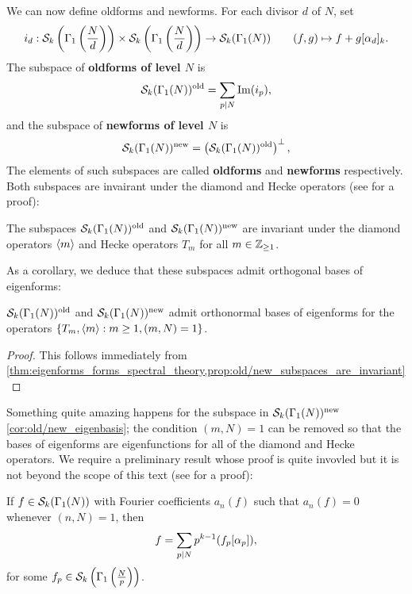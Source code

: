       We can now define oldforms and newforms. For each divisor $d$ of $N$, set
      \[
        i_{d}:\mathcal{S}_{k}\left(\Gamma_{1}\left(\frac{N}{d}\right)\right)\times\mathcal{S}_{k}\left(\Gamma_{1}\left(\frac{N}{d}\right)\right) \to \mathcal{S}_{k}(\Gamma_{1}(N)) \qquad (f,g) \mapsto f+g[\alpha_{d}]_{k}.
      \]
      The subspace of \textbf{oldforms of level $N$} is
      \[
        \mathcal{S}_{k}(\Gamma_{1}(N))^{\mathrm{old}} = \sum_{p \mid N}\mathrm{Im}(i_{p}),
      \]
      and the subspace of \textbf{newforms of level $N$} is
      \[
        \mathcal{S}_{k}(\Gamma_{1}(N))^{\mathrm{new}} = \left(\mathcal{S}_{k}(\Gamma_{1}(N))^{\mathrm{old}} \right)^{\perp},
      \]
      The elements of such subspaces are called \textbf{oldforms} and \textbf{newforms} respectively. Both subspaces are invairant under the diamond and Hecke operators (see \cite{diamond2005first} for a proof):

      \begin{proposition}\label{prop:old/new_subspaces_are_invariant}
        The subspaces $\mathcal{S}_{k}(\Gamma_{1}(N))^{\mathrm{old}}$ and $\mathcal{S}_{k}(\Gamma_{1}(N))^{\mathrm{new}}$ are invariant under the diamond operators $\langle m\rangle$ and Hecke operators $T_{m}$ for all $m \in \mathbb{Z}_{\ge 1}$.
      \end{proposition}

      As a corollary, we deduce that these subspaces admit orthogonal bases of eigenforms:

      \begin{corollary}\label{cor:old/new_eigenbasis}
        $\mathcal{S}_{k}(\Gamma_{1}(N))^{\mathrm{old}}$ and $\mathcal{S}_{k}(\Gamma_{1}(N))^{\mathrm{new}}$ admit orthonormal bases of eigenforms for the operators $\{T_{m},\langle m\rangle:m \ge 1, (m,N) = 1\}$.
      \end{corollary}
      \begin{proof}
        This follows immediately from \cref{thm:eigenforms_forms_spectral_theory,prop:old/new_subspaces_are_invariant}
      \end{proof}

      Something quite amazing happens for the subspace in $\mathcal{S}_{k}(\Gamma_{1}(N))^{\mathrm{new}}$ \cref{cor:old/new_eigenbasis}; the condition $(m,N) = 1$ can be removed so that the bases of eigenforms are eigenfunctions for all of the diamond and Hecke operators. We require a preliminary result whose proof is quite invovled but it is not beyond the scope of this text (see \cite{diamond2005first} for a proof):

      \begin{lemma}\label{lem:the_main_lemma_for_newforms}
        If $f \in \mathcal{S}_{k}(\Gamma_{1}(N))$ with Fourier coefficients $a_{n}(f)$ such that $a_{n}(f) = 0$ whenever $(n,N) = 1$, then
        \[
          f = \sum_{p \mid N}p^{k-1}(f_{p}[\alpha_{p}]),
        \]
        for some $f_{p} \in \mathcal{S}_{k}\left(\Gamma_{1}\left(\frac{N}{p}\right)\right)$.
      \end{lemma}


